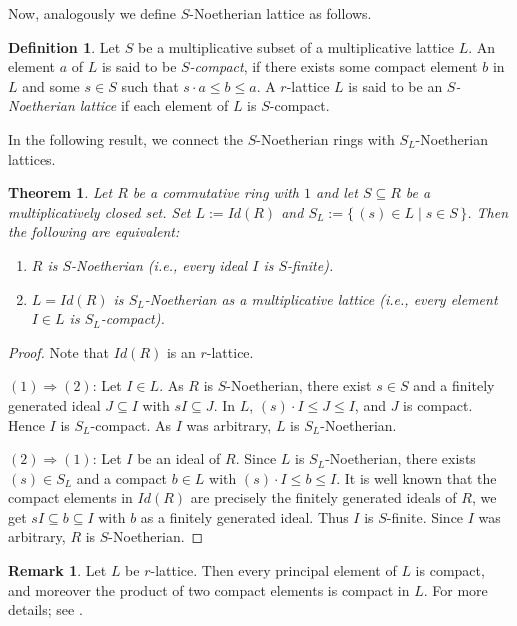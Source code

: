 \documentclass[10pt,twoside,a4]{amsart}
\numberwithin{equation}{section}
\theoremstyle{plain}
\newtheorem{thm}[lem]{Theorem}
\theoremstyle{definition}
\newtheorem{rem}[lem]{Remark}
\newtheorem{defn}[lem]{Definition}
\begin{document}
 
Now, analogously we define  $S$-Noetherian lattice as follows.

\begin{defn}
	Let $S$ be a multiplicative subset of a multiplicative lattice $L$. An element $a$ of $L$ is said to be \textit{$S$-compact}, if there exists some compact element $b$ in $L$ and some $s \in S$ such that $s\cdot a \leq b \leq a$. A $r$-lattice $L$ is said to be an \textit{$S$-Noetherian lattice} if each element of $L$ is $S$-compact.  
\end{defn}



In the following result, we connect the $S$-Noetherian rings with $S_L$-Noetherian lattices.

\begin{thm}\label{thm:SL-Noeth}
	Let $R$ be a commutative ring with $1$ and let $S\subseteq R$ be a multiplicatively closed set.
	Set $L:=Id(R)$ and $S_L:=\{\, (s)\in L \mid s\in S \,\}$.
	Then the following are equivalent:
	\begin{enumerate}
		\item $R$ is $S$-Noetherian (i.e., every ideal $I$ is $S$-finite).
		\item $L=Id(R)$ is $S_L$-Noetherian as a multiplicative lattice (i.e., every element $I\in L$ is $S_L$-compact).
	\end{enumerate}
\end{thm}

\begin{proof}
	Note that $Id(R)$ is an $r$-lattice.
	
	$(1)\Rightarrow(2)$:
	Let $I\in L$. As $R$ is $S$-Noetherian, there exist $s\in S$ and a finitely generated ideal $J\subseteq I$ with $sI\subseteq J$.
	In $L$, $(s)\cdot I  \leq J \leq I$, and $J$ is compact. Hence $I$ is $S_L$-compact. As $I$ was arbitrary, $L$ is $S_L$-Noetherian.
	
	$(2)\Rightarrow(1)$:
	Let $I$ be an ideal of $R$. Since $L$ is  $S_L$-Noetherian, there exists $(s)\in S_L$ and a compact $b\in L$ with $(s)\cdot I\leq b\leq I$.
	It is well known that the compact elements in $Id(R)$ are precisely the  finitely generated ideals of $R$, we get $sI\subseteq b\subseteq I$ with $b$ as a finitely generated ideal. Thus $I$ is $S$-finite. Since $I$ was arbitrary, $R$ is $S$-Noetherian.
\end{proof}
\begin{rem}\label{remark}
	Let $L$ be $r$-lattice. Then every principal element of $L$ is compact, and moreover the product of two compact elements is compact in $L$. For more details; see \cite{A}. 
\end{rem}
\end{document}
